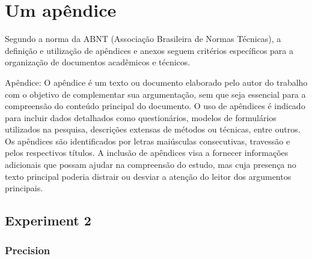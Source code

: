 
\chapter{Um apêndice}

    Segundo a norma da ABNT (Associação Brasileira de Normas Técnicas), a definição e utilização de apêndices e anexos seguem critérios específicos para a organização de documentos acadêmicos e técnicos.
    
    Apêndice: O apêndice é um texto ou documento elaborado pelo autor do trabalho com o objetivo de complementar sua argumentação, sem que seja essencial para a compreensão do conteúdo principal do documento. O uso de apêndices é indicado para incluir dados detalhados como questionários, modelos de formulários utilizados na pesquisa, descrições extensas de métodos ou técnicas, entre outros. Os apêndices são identificados por letras maiúsculas consecutivas, travessão e pelos respectivos títulos. A inclusão de apêndices visa a fornecer informações adicionais que possam ajudar na compreensão do estudo, mas cuja presença no texto principal poderia distrair ou desviar a atenção do leitor dos argumentos principais.

    
    

    \section{Experiment 2}
    \label{sec:exp2_appendix}

        \subsection{Precision}


